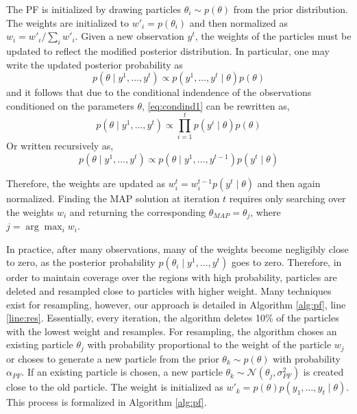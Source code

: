 The PF is initialized by drawing particles $\theta_i \sim p(\theta)$ from the prior distribution. The weights are initialized to $w'_i = p(\theta_i)$ and then normalized as $w_i = w'_i / \sum_i w'_i$. 
Given a new observation $y^t$, the weights of the particles must be updated to reflect the modified posterior distribution. In particular, one may write the updated posterior probability as
\begin{equation}
 p(\theta \mid y^1, \hdots, y^t) \propto p(y^1, \hdots,y^t \mid \theta)p(\theta) \label{eq:condind1}
\end{equation}
and it follows that due to the conditional indendence of the observations conditioned on the parameters $\theta$, \eqref{eq:condind1} can be rewritten as,
\begin{equation}
 p(\theta \mid y^1, \hdots, y^t) \propto \prod_{i=1}^t p(y^i\mid \theta)p(\theta) \label{eq:condind2}
\end{equation}
Or written recursively as,
\begin{equation}
 p(\theta \mid y^1, \hdots, y^t) \propto p(\theta \mid y^1, \hdots, y^{t-1})p(y^t\mid \theta) \label{eq:condind3}
\end{equation}

Therefore, the weights are updated as $w_i^t = w_i^{t-1}p(y^t \mid \theta)$ and then again normalized. Finding the MAP solution at iteration $t$ requires only searching over the weights $w_i$ and returning the corresponding $\hat \theta_{MAP} = \theta_{j}$, where $j = \arg\max_i w_i$.

In practice, after many observations, many of the weights become negligibly close to zero, as the posterior probability $p(\theta_i \mid y^1,\hdots,y^t)$ goes to zero. Therefore, in order to maintain coverage over the regions with high probability, particles are deleted and resampled close to particles with higher weight. Many techniques exist for resampling, however, our approach is detailed in Algorithm \ref{alg:pf}, line \ref{line:res}. Essentially, every iteration, the algorithm deletes 10\% of the particles with the lowest weight and resamples. For resampling, the algorithm choses an existing particle $\theta_j$ with probability proportional to the weight of the particle $w_j$ or choses to generate a new particle from the prior $\theta_k \sim p(\theta)$ with probability $\alpha_{PF}$. If an existing particle is chosen, a new particle $\theta_k \sim \mathcal{N}(\theta_j,\sigma_{PF}^2)$ is created close to the old particle. 
The weight is initialized as $w'_k = p(\theta)p(y_1,\hdots,y_t \mid \theta)$.
This process is formalized in Algorithm \ref{alg:pf}. 

